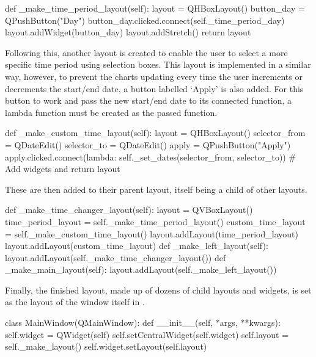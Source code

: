     \begin{python}
def _make_time_period_layout(self):
    layout = QHBoxLayout()
    button_day = QPushButton("Day")
    button_day.clicked.connect(self._time_period_day)
    layout.addWidget(button_day)
    layout.addStretch()
    return layout
    \end{python}

    Following this, another layout is created to enable the user to select a more specific time period using selection boxes. This layout is implemented in a similar way, however, to prevent the charts updating every time the user increments or decrements the start/end date, a button labelled `Apply' is also added. For this button to work and pass the new start/end date to its connected function, a lambda function must be created as the passed function.

    \begin{python}
def _make_custom_time_layout(self):
    layout = QHBoxLayout()
    selector_from = QDateEdit()
    selector_to = QDateEdit()
    apply = QPushButton("Apply")
    apply.clicked.connect(lambda: self._set_dates(selector_from, selector_to))
    # Add widgets and return layout
    \end{python}

    These are then added to their parent layout, itself being a child of other layouts.

    \begin{python}
def _make_time_changer_layout(self):
    layout = QVBoxLayout()
    time_period_layout = self._make_time_period_layout() 
    custom_time_layout = self._make_custom_time_layout() 
    layout.addLayout(time_period_layout)
    layout.addLayout(custom_time_layout)
def _make_left_layout(self):
    layout.addLayout(self._make_time_changer_layout())
def _make_main_layout(self):
    layout.addLayout(self._make_left_layout())
    \end{python}

    Finally, the finished layout, made up of dozens of child layouts and widgets, is set as the layout of the window itself in .

    \begin{python}
class MainWindow(QMainWindow):
    def __init__(self, *args, **kwargs):
        self.widget = QWidget(self)
        self.setCentralWidget(self.widget)
        self.layout = self._make_layout()
        self.widget.setLayout(self.layout)  
    \end{python}

